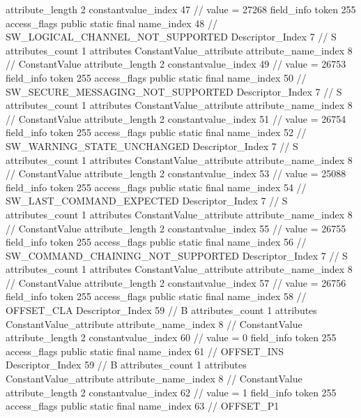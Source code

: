 {{{{{{{					attribute_length	2
					constantvalue_index	47		// value = 27268
				}
				}
			}
			field_info {
				token	255
				access_flags	public static final
				name_index	48		// SW_LOGICAL_CHANNEL_NOT_SUPPORTED
				Descriptor_Index	7		// S
				attributes_count	1
				attributes {
				ConstantValue_attribute {
					attribute_name_index	8		// ConstantValue
					attribute_length	2
					constantvalue_index	49		// value = 26753
				}
				}
			}
			field_info {
				token	255
				access_flags	public static final
				name_index	50		// SW_SECURE_MESSAGING_NOT_SUPPORTED
				Descriptor_Index	7		// S
				attributes_count	1
				attributes {
				ConstantValue_attribute {
					attribute_name_index	8		// ConstantValue
					attribute_length	2
					constantvalue_index	51		// value = 26754
				}
				}
			}
			field_info {
				token	255
				access_flags	public static final
				name_index	52		// SW_WARNING_STATE_UNCHANGED
				Descriptor_Index	7		// S
				attributes_count	1
				attributes {
				ConstantValue_attribute {
					attribute_name_index	8		// ConstantValue
					attribute_length	2
					constantvalue_index	53		// value = 25088
				}
				}
			}
			field_info {
				token	255
				access_flags	public static final
				name_index	54		// SW_LAST_COMMAND_EXPECTED
				Descriptor_Index	7		// S
				attributes_count	1
				attributes {
				ConstantValue_attribute {
					attribute_name_index	8		// ConstantValue
					attribute_length	2
					constantvalue_index	55		// value = 26755
				}
				}
			}
			field_info {
				token	255
				access_flags	public static final
				name_index	56		// SW_COMMAND_CHAINING_NOT_SUPPORTED
				Descriptor_Index	7		// S
				attributes_count	1
				attributes {
				ConstantValue_attribute {
					attribute_name_index	8		// ConstantValue
					attribute_length	2
					constantvalue_index	57		// value = 26756
				}
				}
			}
			field_info {
				token	255
				access_flags	public static final
				name_index	58		// OFFSET_CLA
				Descriptor_Index	59		// B
				attributes_count	1
				attributes {
				ConstantValue_attribute {
					attribute_name_index	8		// ConstantValue
					attribute_length	2
					constantvalue_index	60		// value = 0
				}
				}
			}
			field_info {
				token	255
				access_flags	public static final
				name_index	61		// OFFSET_INS
				Descriptor_Index	59		// B
				attributes_count	1
				attributes {
				ConstantValue_attribute {
					attribute_name_index	8		// ConstantValue
					attribute_length	2
					constantvalue_index	62		// value = 1
				}
				}
			}
			field_info {
				token	255
				access_flags	public static final
				name_index	63		// OFFSET_P1
}}}}}
